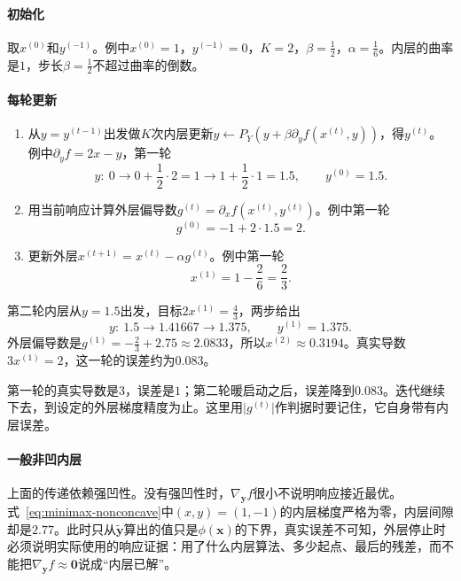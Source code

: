 \paragraph{初始化}
取$x^{(0)}$和$y^{(-1)}$。例中$x^{(0)}=1$，$y^{(-1)}=0$，$K=2$，$\beta=\frac12$，$\alpha=\frac16$。内层的曲率是$1$，步长$\beta=\frac12$不超过曲率的倒数。

\paragraph{每轮更新}
\begin{enumerate}
 \item 从$y=y^{(t-1)}$出发做$K$次内层更新$y\leftarrow P_Y(y+\beta\partial_yf(x^{(t)},y))$，得$y^{(t)}$。例中$\partial_yf=2x-y$，第一轮
 \[
  y:\ 0\to0+\frac12\cdot2=1\to1+\frac12\cdot1=1.5,\qquad y^{(0)}=1.5.
 \]
 \item 用当前响应计算外层偏导数$g^{(t)}=\partial_xf(x^{(t)},y^{(t)})$。例中第一轮
 \[
  g^{(0)}=-1+2\cdot1.5=2.
 \]
 \item 更新外层$x^{(t+1)}=x^{(t)}-\alpha g^{(t)}$。例中第一轮
 \[
  x^{(1)}=1-\frac26=\frac23.
 \]
\end{enumerate}

第二轮内层从$y=1.5$出发，目标$2x^{(1)}=\frac43$，两步给出
\[
 y:\ 1.5\to1.41667\to1.375,\qquad y^{(1)}=1.375.
\]
外层偏导数是$g^{(1)}=-\frac23+2.75\approx2.0833$，所以$x^{(2)}\approx0.3194$。真实导数$3x^{(1)}=2$，这一轮的误差约为$0.083$。

第一轮的真实导数是$3$，误差是$1$；第二轮暖启动之后，误差降到$0.083$。迭代继续下去，到设定的外层梯度精度为止。这里用$\lvert g^{(t)}\rvert$作判据时要记住，它自身带有内层误差。

\paragraph{一般非凹内层}
上面的传递依赖强凹性。没有强凹性时，$\nabla_{\bm{y}}f$很小不说明响应接近最优。式~\eqref{eq:minimax-nonconcave}中$(x,y)=(1,-1)$的内层梯度严格为零，内层间隙却是$2.77$。此时只从$\tilde{\bm{y}}$算出的值只是$\phi(\bm{x})$的下界，真实误差不可知，外层停止时必须说明实际使用的响应证据：用了什么内层算法、多少起点、最后的残差，而不能把$\nabla_{\bm{y}}f\approx\bm{0}$说成“内层已解”。
